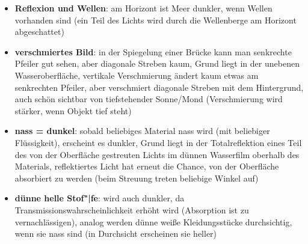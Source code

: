 \linie
\pagebreak
\begin{itemize}
    \item
    \textbf{Reflexion und Wellen}:
    am Horizont ist Meer dunkler, wenn Wellen vorhanden sind
    (ein Teil des Lichts wird durch die Wellenberge am Horizont abgeschattet)

    \item
    \textbf{verschmiertes Bild}:
    in der Spiegelung einer Brücke kann man senkrechte Pfeiler gut sehen, aber
    diagonale Streben kaum, Grund liegt in der unebenen Wasseroberfläche,
    vertikale Verschmierung ändert kaum etwas am senkrechten Pfeiler,
    aber verschmiert diagonale Streben mit dem Hintergrund,
    auch schön sichtbar von tiefstehender Sonne/Mond
    (Verschmierung wird stärker, wenn Objekt tief steht)
\end{itemize}
\linie
\begin{itemize}
    \item
    \textbf{nass = dunkel}:
    sobald beliebiges Material nass wird (mit beliebiger Flüssigkeit),
    erscheint es dunkler, Grund liegt in der Totalreflektion eines
    Teil des von der Oberfläche gestreuten Lichts im dünnen Wasserfilm
    oberhalb des Materials, reflektiertes Licht hat erneut die Chance,
    von der Oberfläche absorbiert zu werden
    (beim Streuung treten beliebige Winkel auf)

    \item
    \textbf{dünne helle Stof"|fe}:
    wird auch dunkler, da Transmissionswahrscheinlichkeit erhöht wird
    (Absorption ist zu vernachlässigen),
    analog werden dünne weiße Kleidungsstücke durchsichtig, wenn sie nass
    sind (in Durchsicht erscheinen sie heller)
\end{itemize}
\linie
